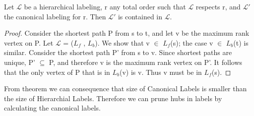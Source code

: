 \documentclass[english,draft]{article}
\begin{document}
 \begin{H_in_C}
 

	Let $\mathcal{L}$ be a hierarchical labeling, r any total order such that $\mathcal{L}$
	respects r, and $\mathcal{L'}$ the canonical labeling for r. Then $\mathcal{L'}$ is contained in $\mathcal{L}$.
 \end{H_in_C}
\begin{proof}
Consider the shortest path P from s to t, and let v be the maximum
rank vertex on P. Let $\mathcal{L}$ = (${L}_{f}$ , ${L}_{b}$).
We show that v $\in$ ${L}_{f}$(s); the case v $\in$ ${L}_{b}$(t)
is similar.
Consider the shortest path P' from s to v. Since shortest paths are
unique, P' $\subseteq$ P, and therefore v is the maximum rank vertex on P'.
It follows
that the only vertex of P that is in ${L}_{b}$(v) is v. Thus v must be in ${L}_{f}$(s). 


\end{proof}
From theorem we can consequence that size of Canonical Labels is smaller than the size of Hierarchial Labels.	
Therefore we can prune hubs in labels by calculating the canonical labels.


\tableofcontents

\listoffigures
\listoftables










\printbibliography[heading=bibintoc]


\appendix

\end{document}
